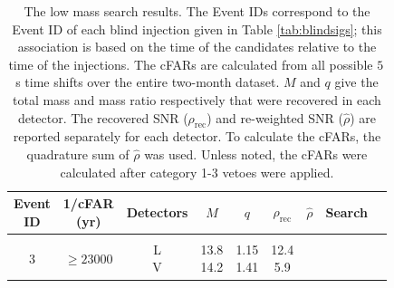 \begin{table}
\caption{\label{tab:ihopeEvents}The low mass \ihope{} search results. 
The Event IDs
correspond to the Event ID of each blind injection given in Table
\ref{tab:blindsigs}; this association is based on the time of the candidates
relative to the time of the injections. The cFARs are
calculated from all possible $5\,$s time shifts over the entire two-month 
dataset. $M$ and $q$ give the total mass and mass ratio 
respectively that were recovered in each detector. The
recovered SNR ($\rho_{\mathrm{rec}}$) and re-weighted SNR ($\hat{\rho}$) are
reported separately for each detector. To calculate the cFARs, the quadrature
sum of $\hat{\rho}$ was used. Unless noted, the cFARs were calculated after
category 1-3 vetoes were applied.}
\begin{tabular}{@{}ccccccccc}
     \hline
    \subrows{Event\\ID} & \subrows{1/cFAR\\(yr)} & Detectors & $M$ & 
$q$ & $\rho_{\mathrm{rec}}$ & $\hat{\rho}$ & 
Search \\
     \hline
     \\
    \multirow{2}{*}{3} & $\geq 23000$ & \subrows{L\\V} & \subrows{13.8\\14.2} & 
\subrows{1.15\\1.41} & \subrows{12.4\\5.9} & 

\end{tabular}
\end{table}
